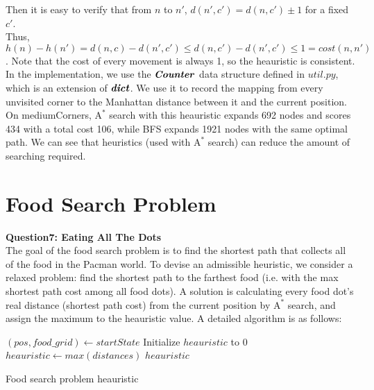 \documentclass[UTF8]{ctexart}
\begin{document}
Then it is easy to verify that from $n$ to $n'$, $d(n', c') = d(n,c') \pm 1$ for a fixed $c'$.\\
Thus, $h(n)-h(n') = d(n,c)-d(n',c') \leq d(n,c')-d(n',c') \leq 1 = cost(n,n')$.
Note that the cost of every movement is always 1, so the heauristic is consistent.\\
In the implementation, we use the $\textbf{\textit{Counter}}$ data structure defined in $util.py$, which is an extension of $\textbf{\textit{dict}}$.
We use it to record the mapping from every unvisited corner to the Manhattan distance between it and the current position.\\
On mediumCorners, $\text{A}^*$ search with this heauristic expands 692 nodes and scores 434 with a total cost 106, while BFS expands 1921 nodes with the same optimal path.
We can see that heuristics (used with $\text{A}^*$ search) can reduce the amount of searching required.
\section{Food Search Problem}                                                     
\textbf{Question7: Eating All The Dots}\\
The goal of the food search problem is to find the shortest path that collects all of the food in the Pacman world. To devise an admissible heuristic, we consider a relaxed problem:
find the shortest path to the farthest food (i.e. with the max shortest path cost among all food dots). A solution is calculating every food dot's real distance (shortest path cost) from the current position by $\text{A}^*$ search,
and assign the maximum to the heauristic value. A detailed algorithm is as follows:\\
\begin{algorithm}[H]
  \DontPrintSemicolon
    \SetAlgoLined
    $(pos , food\_grid) \gets startState$\;
    Initialize $heauristic$ to 0\;
    $heauristic \gets max(distances)$\;
    \Return $heauristic$ \;
    \caption{Food search problem heauristic}
\end{algorithm}
\end{document}
